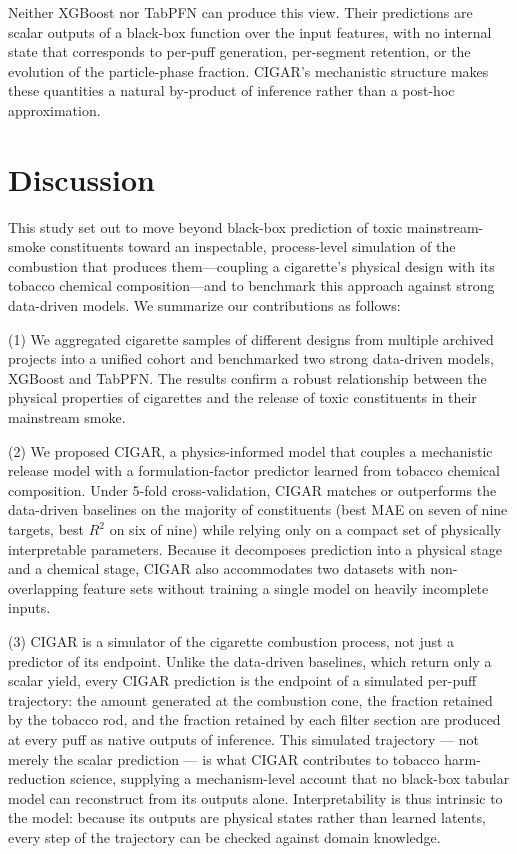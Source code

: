 \documentclass[11pt]{article}
\begin{document}


Neither XGBoost nor TabPFN can produce this view. Their
predictions are scalar outputs of a black-box function over the input
features, with no internal state that corresponds to per-puff generation,
per-segment retention, or the evolution of the particle-phase fraction.
CIGAR's mechanistic structure makes these quantities a natural by-product
of inference rather than a post-hoc approximation.


\section*{Discussion}

This study set out to move beyond black-box prediction of toxic mainstream-smoke constituents toward an inspectable, process-level simulation of the combustion that produces them---coupling a cigarette's physical design with its tobacco chemical composition---and to benchmark this approach against strong data-driven models. We summarize our contributions as follows:

(1) We aggregated cigarette samples of different designs from multiple archived projects into a unified cohort and benchmarked two strong data-driven models, XGBoost and TabPFN. The results confirm a robust relationship between the physical properties of cigarettes and the release of toxic constituents in their mainstream smoke.

(2) We proposed CIGAR, a physics-informed model that couples a mechanistic release model with a formulation-factor predictor learned from tobacco chemical composition. Under 5-fold cross-validation, CIGAR matches or outperforms the data-driven baselines on the majority of constituents (best MAE on seven of nine targets, best $R^2$ on six of nine) while relying only on a compact set of physically interpretable parameters. Because it decomposes prediction into a physical stage and a chemical stage, CIGAR also accommodates two datasets with non-overlapping feature sets without training a single model on heavily incomplete inputs.

(3) CIGAR is a simulator of the cigarette combustion process, not just a predictor of its endpoint. Unlike the data-driven baselines, which return only a scalar yield, every CIGAR prediction is the endpoint of a simulated per-puff trajectory: the amount generated at the combustion cone, the fraction retained by the tobacco rod, and the fraction retained by each filter section are produced at every puff as native outputs of inference. This simulated trajectory --- not merely the scalar prediction --- is what CIGAR contributes to tobacco harm-reduction science, supplying a mechanism-level account that no black-box tabular model can reconstruct from its outputs alone. Interpretability is thus intrinsic to the model: because its outputs are physical states rather than learned latents, every step of the trajectory can be checked against domain knowledge.
\end{document}
